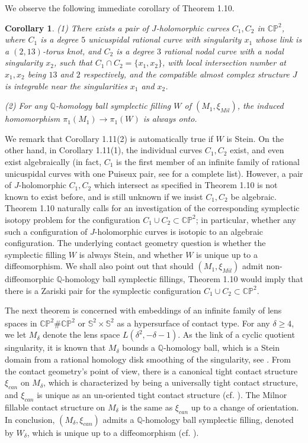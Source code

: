 \documentclass[11pt]{amsart}
\theoremstyle{plain}
\numberwithin{theorem}{section}
\newtheorem{corollary}[theorem]{Corollary}
\theoremstyle{definition}
\newcommand{\C}{{\mathbb C}}
\newcommand{\Q}{{\mathbb Q}}
\renewcommand{\P}{{\mathbb P}}
\newcommand{\s}{{\mathbb S}}
\begin{document}
We observe the following immediate corollary of Theorem 1.10.

\begin{corollary}
{\em(1)} There exists a pair of $J$-holomorphic curves $C_1,C_2$ in $\C\P^2$, where $C_1$ is
a degree $5$ unicuspidal rational curve with singularity $x_1$ whose link is a $(2,13)$-torus knot,
and $C_2$ is a degree $3$ rational nodal curve with a nodal singularity $x_2$, such that 
$C_1\cap C_2=\{x_1,x_2\}$, with local intersection number at $x_1,x_2$ being $13$ and $2$
respectively, and the compatible almost complex structure $J$ is integrable near the singularities 
$x_1$ and $x_2$. 

{\em(2)} For any $\Q$-homology ball symplectic filling $W$ of $(M_1,\xi_{Mil})$, the induced 
homomorphism $\pi_1(M_1)\rightarrow \pi_1(W)$ is always onto. 
\end{corollary}

We remark that Corollary 1.11(2) is automatically true if $W$ is Stein. On the other hand, in 
Corollary 1.11(1), the individual curves $C_1,C_2$ exist, and even exist algebraically (in fact, $C_1$ is the first member of an infinite family of rational unicuspidal curves with one Puiseux pair, see \cite{F} for a
complete list). However, a pair of $J$-holomorphic $C_1,C_2$ which intersect as specified in 
Theorem 1.10 is not known to exist before, and is still unknown if we insist $C_1,C_2$ be algebraic. Theorem 1.10 naturally calls for an investigation of the corresponding symplectic isotopy problem for the configuration
$C_1\cup C_2\subset \C\P^2$; in particular, whether any such a configuration of $J$-holomorphic
curves is isotopic to an algebraic configuration. The underlying contact geometry question is whether
the symplectic filling $W$ is always Stein, and whether $W$ is unique up to a diffeomorphism. We shall also
point out that should $(M_1,\xi_{Mil})$ admit non-diffeomorphic $\Q$-homology ball  symplectic fillings, Theorem 1.10 would imply that there is a Zariski pair for the symplectic configuration $C_1\cup C_2\subset \C\P^2$.

\vspace{2mm}

The next theorem is concerned with embeddings of an infinite family of lens spaces in $\C\P^2\# \overline{\C\P^2}$ 
or $\s^2\times \s^2$ as a hypersurface of contact type. For any $\delta\geq 4$, we let $M_\delta$ denote the lens space $L(\delta^2,-\delta-1)$. As the link of a cyclic quotient singularity, it is known that $M_\delta$ bounds a $\Q$-homology ball, which is a Stein domain from a rational homology disk smoothing of the singularity, see \cite{W0}. From the contact geometry's point of view, there is a canonical tight contact structure $\xi_{can}$ on $M_\delta$, which is characterized by being a universally tight contact structure, and $\xi_{can}$ is unique as 
an un-oriented tight contact structure (cf. \cite{H}). The Milnor fillable contact structure on $M_\delta$ 
is the same as $\xi_{can}$ up to a change of orientation. In conclusion, $(M_\delta,\xi_{can})$ admits a $\Q$-homology ball symplectic filling, denoted by $W_\delta$, which is unique up to a 
diffeomorphism (cf. \cite{ER}).  
\end{document}
